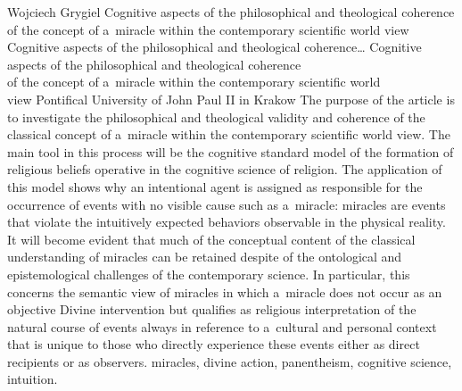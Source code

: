\begin{artengenv}{Wojciech Grygiel}
	{Cognitive aspects of the philosophical and theological coherence of the concept of a~miracle within the contemporary scientific world view}
	{Cognitive aspects of the philosophical and theological coherence\ldots}
	{Cognitive aspects of the philosophical and theological coherence\\of the concept of a~miracle within the contemporary scientific world\\
	view}
	{Pontifical University of John Paul II in Krakow}
	{The purpose of the article is to investigate the philosophical and theological validity and coherence of the classical concept of a~miracle within the contemporary scientific world view. The main tool in this process will be the cognitive standard model of the formation of religious beliefs operative in the cognitive science of religion. The application of %
	this model shows why an intentional agent is assigned as responsible for the occurrence of events with no visible cause such as a~miracle: miracles are events that violate the intuitively expected behaviors observable in the physical reality. It will become evident that much of the conceptual content of the classical understanding of miracles can be retained despite of the ontological and epistemological challenges of the contemporary science. In particular, this concerns the semantic view of miracles in which a~miracle does not occur as an objective Divine intervention but qualifies as religious interpretation of the natural course of events always in reference to a~cultural and personal context that is unique to those who directly experience these events either as direct recipients or as observers.}
	{miracles, divine action, panentheism, cognitive science, intuition.}
	
	




\end{artengenv}
